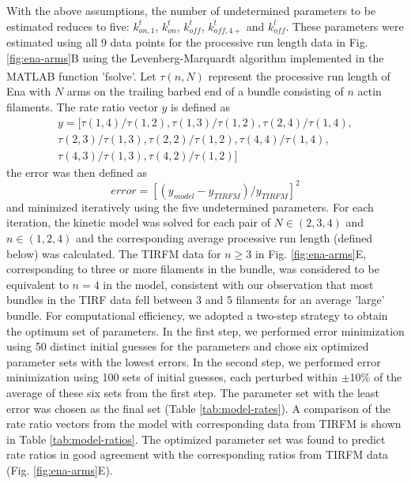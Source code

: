 With the above assumptions, the number of undetermined parameters to be estimated reduces to five: $k_{on,1}^{t}$, $k_{on}^{t}$, $k_{off}^{t}$, $k_{off,4+}^{t}$ and $k_{off}^{l}$. These parameters were estimated using all 9 data points for the processive run length data in Fig. \ref{fig:ena-arms}B using the Levenberg-Marquardt algorithm implemented in the MATLAB\textsuperscript{\textregistered} function 'fsolve'. Let $\tau(n,N)$ represent the processive run length of Ena with $N$ arms on the trailing barbed end of a bundle consisting of $n$ actin filaments. The rate ratio vector $y$ is defined as
\begin{equation}\label{eqn:ratio-vector}
\begin{split}
y = [\tau(1,4)/\tau(1,2), \tau(1,3)/\tau(1,2), \tau(2,4)/\tau(1,4),\\
 \tau(2,3)/\tau(1,3), \tau(2,2)/\tau(1,2), \tau(4,4)/\tau(1,4),\\
 \tau(4,3)/\tau(1,3), \tau(4,2)/\tau(1,2)] 
\end{split}
\end{equation}
the error was then defined as
\begin{equation}\label{eqn:error}
error=[(y_{model}-y_{TIRFM})/y_{TIRFM}]^{2}
\end{equation}
and minimized iteratively using the five undetermined parameters. For each iteration, the kinetic model was solved for each pair of $N\in(2,3,4)$ and $n\in(1,2,4)$ and the corresponding average processive run length (defined below) was calculated. The TIRFM data for $n\geq 3$ in Fig. \ref{fig:ena-arms}E, corresponding to three or more filaments in the bundle, was considered to be equivalent to $n=4$ in the model, consistent with our observation that most bundles in the TIRF data fell between 3 and 5 filaments for an average 'large' bundle.
For computational efficiency, we adopted a two-step strategy to obtain the optimum set of parameters. In the first step, we performed error minimization using 50 distinct initial guesses for the parameters and chose six optimized parameter sets with the lowest errors. In the second step, we performed error minimization using 100 sets of initial guesses, each perturbed within $\pm$10\% of the average of these six sets from the first step. The parameter set with the least error was chosen as the final set (Table \ref{tab:model-rates}). A comparison of the rate ratio vectors from the model with corresponding data from TIRFM is shown in Table \ref{tab:model-ratios}. The optimized parameter set was found to predict rate ratios in good agreement with the corresponding ratios from TIRFM data (Fig. \ref{fig:ena-arms}E).

